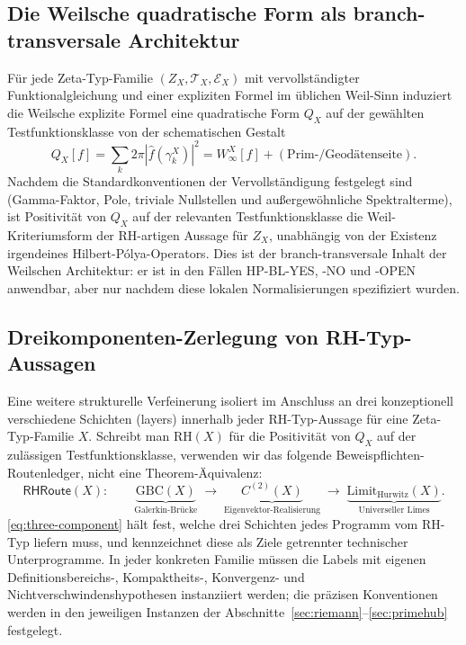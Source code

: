 \documentclass[11pt]{article}
\theoremstyle{definition}
\theoremstyle{remark}
\begin{document}
\subsection{Die Weilsche quadratische Form als branch-transversale Architektur}
\label{sec:weil-qf}

Für jede Zeta-Typ-Familie $(Z_X, \mathcal{T}_X, \mathcal{E}_X)$ mit
vervollständigter Funktionalgleichung und einer expliziten Formel im
üblichen Weil-Sinn induziert die Weilsche explizite Formel
\cite{Weil1952} eine quadratische Form $Q_X$ auf der gewählten
Testfunktionsklasse von der schematischen Gestalt
\begin{equation}
\label{eq:weil-qf-generic}
  Q_X[f] = \sum_k 2\pi |\widehat{f}(\gamma_k^X)|^2
    = W^X_\infty[f] + (\text{Prim-/Geodätenseite}).
\end{equation}
Nachdem die Standardkonventionen der Vervollständigung festgelegt sind
(Gamma-Faktor, Pole, triviale Nullstellen und außergewöhnliche
Spektralterme), ist Positivität von $Q_X$ auf der relevanten
Testfunktionsklasse die Weil-Kriteriumsform der RH-artigen Aussage für
$Z_X$, unabhängig von der Existenz irgendeines Hilbert-P\'olya-Operators.
Dies ist der branch-transversale Inhalt der Weilschen Architektur: er
ist in den Fällen HP-BL-YES, -NO und -OPEN anwendbar, aber nur nachdem
diese lokalen Normalisierungen spezifiziert wurden.

\subsection{Dreikomponenten-Zerlegung von RH-Typ-Aussagen}
\label{sec:three-component}

Eine weitere strukturelle Verfeinerung isoliert im Anschluss an
\cite{MetaGalerkinBridge} drei konzeptionell verschiedene
Schichten (layers) innerhalb jeder RH-Typ-Aussage für eine Zeta-Typ-Familie $X$.
Schreibt man $\mathrm{RH}(X)$ für die Positivität von $Q_X$ auf der
zulässigen Testfunktionsklasse, verwenden wir das folgende
Beweispflichten-Routenledger, nicht eine Theorem-Äquivalenz:
\begin{equation}
\label{eq:three-component}
  \mathsf{RHRoute}(X):\qquad
  \underbrace{\mathrm{GBC}(X)}_{\text{Galerkin-Brücke}}
  \;\longrightarrow\;
  \underbrace{C^{(2)}(X)}_{\text{Eigenvektor-Realisierung}}
  \;\longrightarrow\;
  \underbrace{\mathrm{Limit}_{\mathrm{Hurwitz}}(X)}_{\text{Universeller Limes}}.
\end{equation}
\eqref{eq:three-component} hält fest, welche drei Schichten jedes Programm
vom RH-Typ liefern muss, und kennzeichnet diese als Ziele getrennter
technischer Unterprogramme. In jeder konkreten Familie müssen die Labels mit
eigenen Definitionsbereichs-, Kompaktheits-, Konvergenz- und
Nichtverschwindenshypothesen instanziiert werden; die präzisen Konventionen
werden in den jeweiligen Instanzen der
Abschnitte~\ref{sec:riemann}--\ref{sec:primehub} festgelegt.
\end{document}
